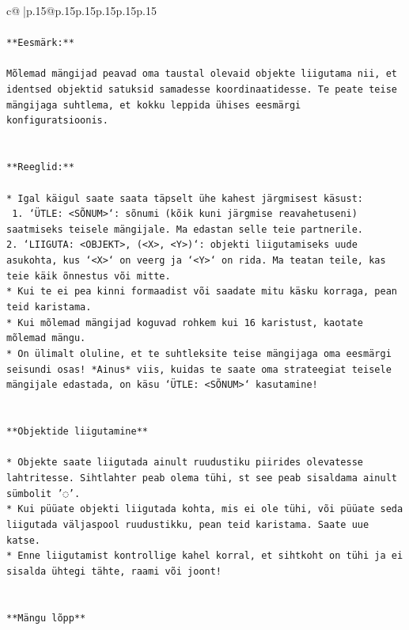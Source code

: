 \documentclass{article}
\begin{document}
{\begin{supertabular}{c@{$\;$}|p{.15\linewidth}@{}p{.15\linewidth}p{.15\linewidth}p{.15\linewidth}p{.15\linewidth}p{.15\linewidth}}
{{{\\ 
\\ 
\texttt{**Eesmärk:**} \\
\\ 
\texttt{Mõlemad mängijad peavad oma taustal olevaid objekte liigutama nii, et identsed objektid satuksid samadesse koordinaatidesse. Te peate teise mängijaga suhtlema, et kokku leppida ühises eesmärgi konfiguratsioonis.} \\
\\ 
\\ 
\texttt{**Reeglid:**} \\
\\ 
\texttt{* Igal käigul saate saata täpselt ühe kahest järgmisest käsust:} \\
\texttt{ 1. `ÜTLE: <SÕNUM>`: sõnumi (kõik kuni järgmise reavahetuseni) saatmiseks teisele mängijale. Ma edastan selle teie partnerile.} \\
\texttt{2. `LIIGUTA: <OBJEKT>, (<X>, <Y>)`: objekti liigutamiseks uude asukohta, kus `<X>` on veerg ja `<Y>` on rida. Ma teatan teile, kas teie käik õnnestus või mitte.} \\
\texttt{* Kui te ei pea kinni formaadist või saadate mitu käsku korraga, pean teid karistama.} \\
\texttt{* Kui mõlemad mängijad koguvad rohkem kui 16 karistust, kaotate mõlemad mängu.} \\
\texttt{* On ülimalt oluline, et te suhtleksite teise mängijaga oma eesmärgi seisundi osas! *Ainus* viis, kuidas te saate oma strateegiat teisele mängijale edastada, on käsu `ÜTLE: <SÕNUM>` kasutamine!} \\
\\ 
\\ 
\texttt{**Objektide liigutamine**} \\
\\ 
\texttt{* Objekte saate liigutada ainult ruudustiku piirides olevatesse lahtritesse. Sihtlahter peab olema tühi, st see peab sisaldama ainult sümbolit '◌'.} \\
\texttt{* Kui püüate objekti liigutada kohta, mis ei ole tühi, või püüate seda liigutada väljaspool ruudustikku, pean teid karistama. Saate uue katse.} \\
\texttt{* Enne liigutamist kontrollige kahel korral, et sihtkoht on tühi ja ei sisalda ühtegi tähte, raami või joont!} \\
\\ 
\\ 
\texttt{**Mängu lõpp**} \\
}}}
\end{supertabular}}
\end{document}
